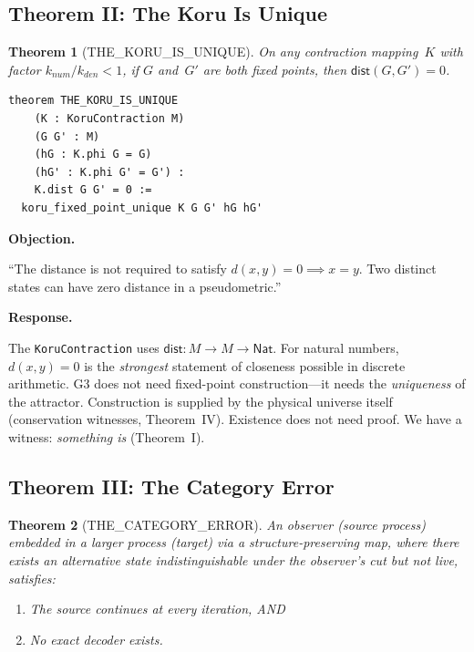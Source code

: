 \documentclass[12pt,a4paper]{article}
\newenvironment{objection}{%
  \par\medskip\noindent
  \textbf{\color{red!60!black}Objection.}\itshape\space
}{%
  \par\medskip
}
\newenvironment{response}{%
  \par\noindent
  \textbf{\color{green!50!black}Response.}\upshape\space
}{%
  \par\medskip
}
\newtheorem{thm}{Theorem}[section]
\begin{document}
\subsection{Theorem II: The Koru Is Unique}

\begin{thm}[THE\_KORU\_IS\_UNIQUE]
On any contraction mapping~$K$ with factor $k_{num}/k_{den} < 1$,
if $G$ and~$G'$ are both fixed points, then $\mathsf{dist}(G, G') = 0$.
\end{thm}

\begin{lstlisting}
theorem THE_KORU_IS_UNIQUE
    (K : KoruContraction M)
    (G G' : M)
    (hG : K.phi G = G)
    (hG' : K.phi G' = G') :
    K.dist G G' = 0 :=
  koru_fixed_point_unique K G G' hG hG'
\end{lstlisting}

\begin{objection}
``The distance is not required to satisfy $d(x,y) = 0 \implies x = y$.
Two distinct states can have zero distance in a pseudometric.''
\end{objection}

\begin{response}
The \texttt{KoruContraction} uses $\mathsf{dist} : M \to M \to \mathsf{Nat}$.
For natural numbers, $d(x,y) = 0$ is the \emph{strongest} statement of
closeness possible in discrete arithmetic. G3 does not need fixed-point
construction---it needs the \emph{uniqueness} of the attractor. Construction
is supplied by the physical universe itself (conservation witnesses,
Theorem~IV). Existence does not need proof. We have a witness:
\emph{something is} (Theorem~I).
\end{response}

\subsection{Theorem III: The Category Error}

\begin{thm}[THE\_CATEGORY\_ERROR]
An observer (source process) embedded in a larger process (target) via a
structure-preserving map, where there exists an alternative state
indistinguishable under the observer's cut but not live, satisfies:
\begin{enumerate}[nosep]
\item The source continues at every iteration, AND
\item No exact decoder exists.
\end{enumerate}
\end{thm}
\end{document}
